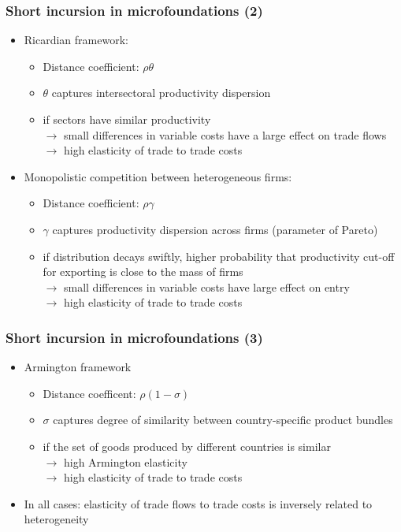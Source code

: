 \documentclass{beamer}
\begin{document}
\begin{frame}[plain]\frametitle{Short incursion in microfoundations (2)}
\begin{itemize}
\item Ricardian framework: 
	\begin{itemize}
	\item Distance coefficient: $\rho\theta$
	\item $\theta$ captures intersectoral productivity dispersion
	\item if sectors have similar productivity \\ $\rightarrow$ small differences in variable costs have a large effect on trade flows
	\\ $\rightarrow$ high elasticity of trade to trade costs
	\end{itemize}
\item Monopolistic competition between heterogeneous firms:
	\begin{itemize}
	\item Distance coefficient: $\rho\gamma$
	\item $\gamma$ captures productivity dispersion across firms (parameter of Pareto)
	\item if distribution decays swiftly, higher probability that productivity cut-off for exporting is close to the mass of firms \\ $\rightarrow$  small differences in variable costs have large effect on entry 
	\\ $\rightarrow$ high elasticity of trade to trade costs
	\end{itemize}
\end{itemize}
\end{frame}

\begin{frame}[plain]\frametitle{Short incursion in microfoundations (3)}
\begin{itemize}
\item Armington framework
	\begin{itemize}
	\item Distance coefficent:  $\rho(1-\sigma)$
	\item $\sigma$ captures degree of similarity between country-specific product bundles
	\item if the set of goods produced by different countries is similar \\ $\rightarrow$ high Armington elasticity 
	\\ $\rightarrow$ high elasticity of trade to trade costs
	\end{itemize}
\item In all cases: elasticity of trade flows to trade costs is inversely related to heterogeneity 
\end{itemize}
\end{frame}
\end{document}
